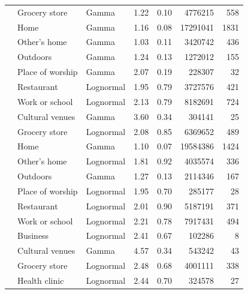 \documentclass[preprint, 3p,
authoryear]{elsarticle} %
\begin{document}
\begin{table}
{\begin{threeparttable}
\begin{tabular}[t]{rllrrrr}
 & Grocery store & Gamma & 1.22 & 0.10 & 4776215 & 558\\

 & Home & Gamma & 1.16 & 0.08 & 17291041 & 1831\\

 & Other's home & Gamma & 1.03 & 0.11 & 3420742 & 436\\

 & Outdoors & Gamma & 1.24 & 0.13 & 1272012 & 155\\

 & Place of worship & Gamma & 2.07 & 0.19 & 228307 & 32\\

 & Restaurant & Lognormal & 1.95 & 0.79 & 3727576 & 421\\

\multirow[t]{-8}{*}{\raggedleft\arraybackslash 2005} & Work or school & Lognormal & 2.13 & 0.79 & 8182691 & 724\\
\cmidrule{1-7}
 & Cultural venues & Gamma & 3.60 & 0.34 & 304141 & 25\\

 & Grocery store & Lognormal & 2.08 & 0.85 & 6369652 & 489\\

 & Home & Gamma & 1.10 & 0.07 & 19584386 & 1424\\

 & Other's home & Lognormal & 1.81 & 0.92 & 4035574 & 336\\

 & Outdoors & Gamma & 1.27 & 0.13 & 2114346 & 167\\

 & Place of worship & Lognormal & 1.95 & 0.70 & 285177 & 28\\

 & Restaurant & Lognormal & 2.01 & 0.90 & 5187191 & 371\\

\multirow[t]{-8}{*}{\raggedleft\arraybackslash 2010} & Work or school & Lognormal & 2.21 & 0.78 & 7917431 & 494\\
\cmidrule{1-7}
 & Business & Lognormal & 2.41 & 0.67 & 102286 & 8\\

 & Cultural venues & Gamma & 4.57 & 0.34 & 543242 & 43\\

 & Grocery store & Lognormal & 2.48 & 0.68 & 4001111 & 338\\

 & Health clinic & Lognormal & 2.44 & 0.70 & 324578 & 27\\


\end{tabular}
\end{threeparttable}}
\end{table}
\end{document}
